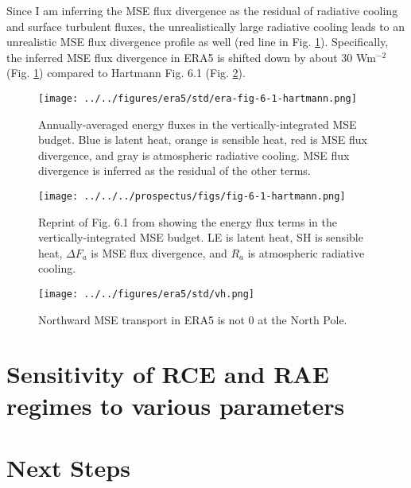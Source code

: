 \documentclass[11pt]{article}
\begin{document}
Since I am inferring the MSE flux divergence as the residual of radiative cooling and surface turbulent fluxes, the unrealistically large radiative cooling leads to an unrealistic MSE flux divergence profile as well (red line in Fig. \ref{fig:orgd2d127f}). Specifically, the inferred MSE flux divergence in ERA5 is shifted down by about 30 Wm\(^{-2}\) (Fig. \ref{fig:orgd2d127f}) compared to Hartmann Fig. 6.1 (Fig. \ref{fig:org8752234}).

\begin{figure}[htbp]
\centering
\texttt{[image: ../../figures/era5/std/era-fig-6-1-hartmann.png]}
\caption{\label{fig:orgd2d127f}Annually-averaged energy fluxes in the vertically-integrated MSE budget. Blue is latent heat, orange is sensible heat, red is MSE flux divergence, and gray is atmospheric radiative cooling. MSE flux divergence is inferred as the residual of the other terms.}
\end{figure}

\begin{figure}[htbp]
\centering
\texttt{[image: ../../../prospectus/figs/fig-6-1-hartmann.png]}
\caption{\label{fig:org8752234}Reprint of Fig. 6.1 from \cite{hartmann_global_2016} showing the energy flux terms in the vertically-integrated MSE budget. LE is latent heat, SH is sensible heat, \(\Delta F_a\) is MSE flux divergence, and \(R_a\) is atmospheric radiative cooling.}
\end{figure}

\begin{figure}[htbp]
\centering
\texttt{[image: ../../figures/era5/std/vh.png]}
\caption{\label{fig:org73c353a}Northward MSE transport in ERA5 is not 0 at the North Pole.}
\end{figure}

\section{Sensitivity of RCE and RAE regimes to various parameters}
\label{sec:orge358300}

\section{Next Steps}
\label{sec:orgbe24baa}



\end{document}
